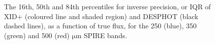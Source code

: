 \documentclass[useAMS,usenatbib]{mnras}
\begin{document}
\begin{figure}
\centering 
\caption{The 16th, 50th and 84th percentiles for inverse precision, or IQR of \textsc{XID+} (coloured line and shaded region) and \textsc{DESPHOT}  (black dashed lines), as a function of true flux, for the 250 (blue), 350 (green) and 500 (red) $\mathrm{\mu m}$ SPIRE bands. }\label{fig:precision}
\end{figure}
\end{document}
